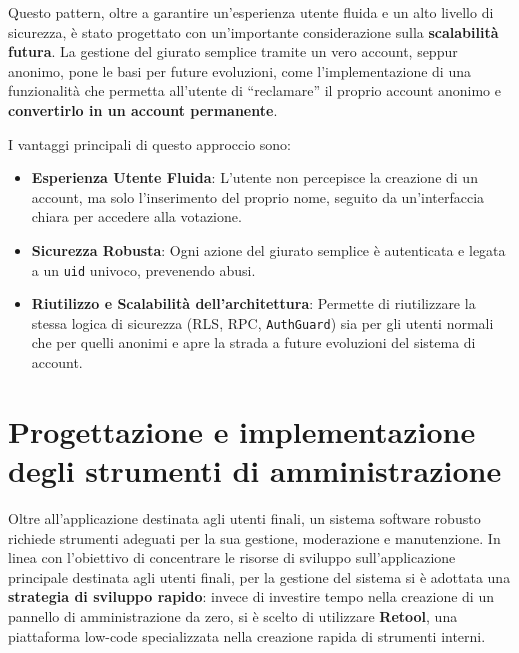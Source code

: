 Questo pattern, oltre a garantire un'esperienza utente fluida e un alto livello di sicurezza, è stato progettato con un'importante considerazione sulla \textbf{scalabilità futura}.
La gestione del giurato semplice tramite un vero account, seppur anonimo, pone le basi per future evoluzioni, come l'implementazione di una funzionalità che permetta all'utente di ``reclamare'' il proprio account anonimo e \textbf{convertirlo in un account permanente}.

I vantaggi principali di questo approccio sono:
\begin{itemize}
    \item \textbf{Esperienza Utente Fluida}: L'utente non percepisce la creazione di un account, ma solo l'inserimento del proprio nome, seguito da un'interfaccia chiara per accedere alla votazione.
    \item \textbf{Sicurezza Robusta}: Ogni azione del giurato semplice è autenticata e legata a un \texttt{uid} univoco, prevenendo abusi.
    \item \textbf{Riutilizzo e Scalabilità dell'architettura}: Permette di riutilizzare la stessa logica di sicurezza (RLS, RPC, \texttt{AuthGuard}) sia per gli utenti normali che per quelli anonimi e apre la strada a future evoluzioni del sistema di account.
\end{itemize}

\section{Progettazione e implementazione degli strumenti di amministrazione}
\label{sec:admin_tools}

Oltre all'applicazione destinata agli utenti finali, un sistema software robusto richiede strumenti adeguati per la sua gestione, moderazione e manutenzione.
In linea con l'obiettivo di concentrare le risorse di sviluppo sull'applicazione principale destinata agli utenti finali, per la gestione del sistema si è adottata una \textbf{strategia di sviluppo rapido}: invece di investire tempo nella creazione di un pannello di amministrazione da zero, si è scelto di utilizzare \textbf{Retool}, una piattaforma low-code specializzata nella creazione rapida di strumenti interni.

